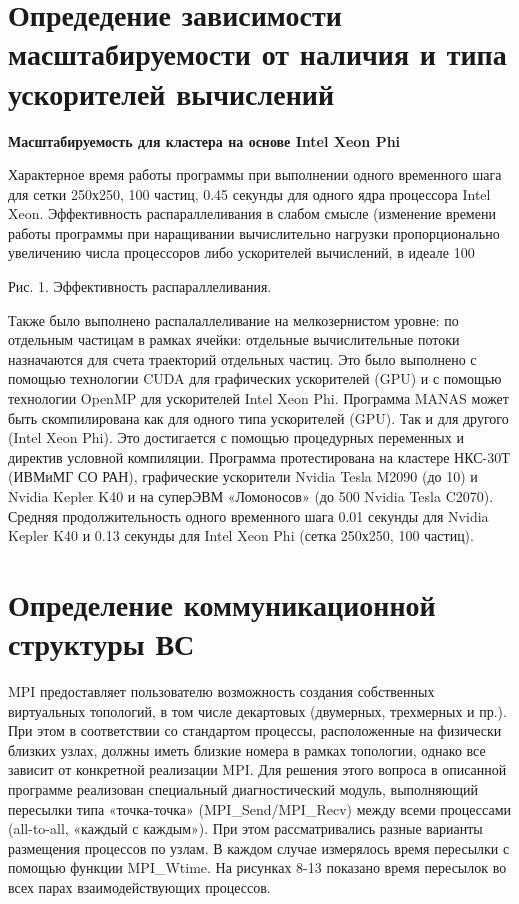        
        \section{Опредедение зависимости масштабируемости от наличия и типа ускорителей вычислений}
        
        \textbf{Масштабируемость для кластера на основе Intel Xeon Phi} 
        
        Характерное время работы программы при выполнении одного временного шага для сетки 250х250, 100 частиц, 0.45 секунды для одного ядра процессора Intel Xeon. Эффективность распараллеливания в слабом смысле (изменение времени работы программы при наращивании вычислительно нагрузки пропорционально увеличению числа процессоров либо ускорителей вычислений, в идеале 100 %
        
        Рис. 1. Эффективность распараллеливания.
        
        Также было выполнено распалаллеливание на мелкозернистом уровне: по отдельным частицам в рамках ячейки: отдельные вычислительные потоки назначаются для счета траекторий отдельных частиц. Это было выполнено с помощью технологии CUDA для графических ускорителей (GPU) и с помощью технологии OpenMP для ускорителей Intel Xeon Phi. Программа MANAS может быть скомпилирована как для одного типа ускорителей (GPU). Так и для другого (Intel Xeon Phi). Это достигается с помощью процедурных переменных и директив условной компиляции. Программа протестирована на кластере НКС-30Т (ИВМиМГ СО РАН), графические ускорители Nvidia Tesla M2090 (до 10) и Nvidia Kepler K40 и на суперЭВМ «Ломоносов»  (до 500 Nvidia Tesla C2070). Средняя продолжительность одного временного шага 0.01 секунды для  Nvidia Kepler K40 и 0.13 секунды для  Intel Xeon Phi (сетка 250х250, 100 частиц).
        
        
        
        
        
        
        
        \section{Определение коммуникационной структуры ВС}
        
        MPI предоставляет пользователю возможность создания собственных виртуальных топологий, в том числе декартовых (двумерных, трехмерных  и пр.). При этом в соответствии со стандартом процессы, расположенные на физически близких узлах, должны иметь близкие номера в рамках топологии, однако все зависит от конкретной реализации MPI.  
        Для решения этого вопроса в описанной программе реализован специальный диагностический модуль, выполняющий пересылки типа «точка-точка» (MPI\_Send/MPI_Recv) между всеми процессами (all-to-all, «каждый с каждым»). При этом рассматривались разные варианты размещения процессов по узлам. В каждом случае измерялось время пересылки с помощью функции MPI_Wtime. На рисунках 8-13 показано время пересылок во всех парах взаимодействующих процессов.
        
